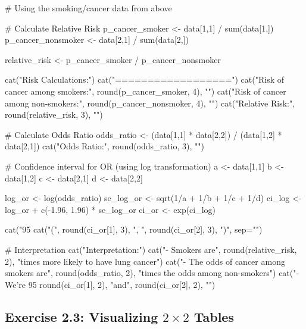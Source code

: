 \documentclass[11pt]{article}
\begin{document}
\begin{rcode}
# Using the smoking/cancer data from above

# Calculate Relative Risk
p_cancer_smoker <- data[1,1] / sum(data[1,])
p_cancer_nonsmoker <- data[2,1] / sum(data[2,])

relative_risk <- p_cancer_smoker / p_cancer_nonsmoker

cat("Risk Calculations:\n")
cat("==================\n")
cat("Risk of cancer among smokers:", round(p_cancer_smoker, 4), "\n")
cat("Risk of cancer among non-smokers:", round(p_cancer_nonsmoker, 4), "\n")
cat("Relative Risk:", round(relative_risk, 3), "\n\n")

# Calculate Odds Ratio
odds_ratio <- (data[1,1] * data[2,2]) / (data[1,2] * data[2,1])
cat("Odds Ratio:", round(odds_ratio, 3), "\n\n")

# Confidence interval for OR (using log transformation)
a <- data[1,1]
b <- data[1,2]
c <- data[2,1]
d <- data[2,2]

log_or <- log(odds_ratio)
se_log_or <- sqrt(1/a + 1/b + 1/c + 1/d)
ci_log <- log_or + c(-1.96, 1.96) * se_log_or
ci_or <- exp(ci_log)

cat("95%
cat("(", round(ci_or[1], 3), ", ", round(ci_or[2], 3), ")\n\n", sep="")

# Interpretation
cat("Interpretation:\n")
cat("- Smokers are", round(relative_risk, 2),
    "times more likely to have lung cancer\n")
cat("- The odds of cancer among smokers are", round(odds_ratio, 2),
    "times the odds among non-smokers\n")
cat("- We're 95%
    round(ci_or[1], 2), "and", round(ci_or[2], 2), "\n")
\end{rcode}

\subsection{Exercise 2.3: Visualizing $2 \times 2$ Tables}
\end{document}
